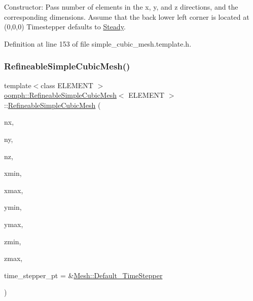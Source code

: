 Constructor\+: Pass number of elements in the x, y, and z directions, and the corresponding dimensions. Assume that the back lower left corner is located at (0,0,0) Timestepper defaults to \hyperlink{classoomph_1_1Steady}{Steady}. 



Definition at line 153 of file simple\+\_\+cubic\+\_\+mesh.\+template.\+h.

\mbox{\label{classoomph_1_1RefineableSimpleCubicMesh_a058dc3781f5bf9b5580380e1161ad7d5}} 
\subsubsection{\texorpdfstring{Refineable\+Simple\+Cubic\+Mesh()}{RefineableSimpleCubicMesh()}\hspace{0.1cm}{\footnotesize\ttfamily [2/2]}}
{\footnotesize\ttfamily template$<$class E\+L\+E\+M\+E\+NT $>$ \\
\hyperlink{classoomph_1_1RefineableSimpleCubicMesh}{oomph\+::\+Refineable\+Simple\+Cubic\+Mesh}$<$ E\+L\+E\+M\+E\+NT $>$\+::\hyperlink{classoomph_1_1RefineableSimpleCubicMesh}{Refineable\+Simple\+Cubic\+Mesh} (\begin{DoxyParamCaption}\item[{const unsigned \&}]{nx,  }\item[{const unsigned \&}]{ny,  }\item[{const unsigned \&}]{nz,  }\item[{const double \&}]{xmin,  }\item[{const double \&}]{xmax,  }\item[{const double \&}]{ymin,  }\item[{const double \&}]{ymax,  }\item[{const double \&}]{zmin,  }\item[{const double \&}]{zmax,  }\item[{\hyperlink{classoomph_1_1TimeStepper}{Time\+Stepper} $\ast$}]{time\+\_\+stepper\+\_\+pt = {\ttfamily \&\hyperlink{classoomph_1_1Mesh_a12243d0fee2b1fcee729ee5a4777ea10}{Mesh\+::\+Default\+\_\+\+Time\+Stepper}} }\end{DoxyParamCaption})\hspace{0.3cm}{\ttfamily [inline]}}



